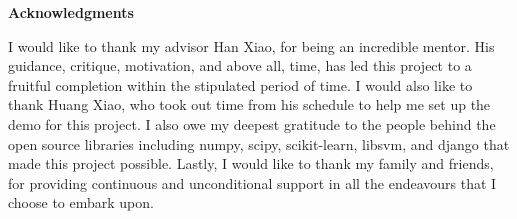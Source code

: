 \clearemptydoublepage
{}
{}	


\vspace*{2cm}

\begin{center}
{\Large \bf Acknowledgments}
\end{center}

\vspace{1cm}

I would like to thank my advisor Han Xiao, for being an incredible mentor. His guidance, critique, motivation, and above all, time, has led this project to a fruitful completion within the stipulated period of time. I would also like to thank Huang Xiao, who took out time from his schedule to help me set up the demo for this project. I also owe my deepest gratitude to the people behind the open source libraries including numpy, scipy, scikit-learn, libsvm, and django that made this project possible. Lastly, I would like to thank my family and friends, for providing continuous and unconditional support in all the endeavours that I choose to embark upon.
